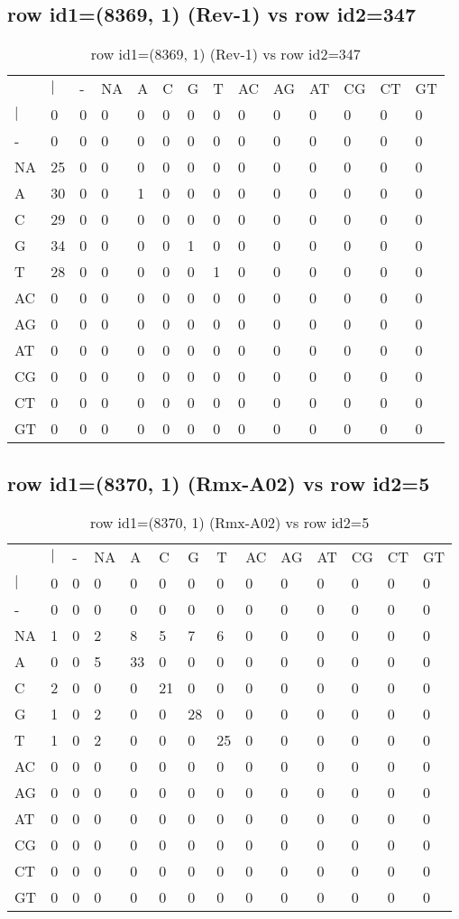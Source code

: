\subsection{row id1=(8369, 1) (Rev-1) vs row id2=347}
\begin{center}
\begin{longtable}{|l|l|l|l|l|l|l|l|l|l|l|l|l|l|}
\caption{row id1=(8369, 1) (Rev-1) vs row id2=347} \label{table_dm602}\\
\hline
\\
\hline
&$|$&-&NA&A&C&G&T&AC&AG&AT&CG&CT&GT\\
$|$&0&0&0&0&0&0&0&0&0&0&0&0&0\\
-&0&0&0&0&0&0&0&0&0&0&0&0&0\\
NA&25&0&0&0&0&0&0&0&0&0&0&0&0\\
A&30&0&0&1&0&0&0&0&0&0&0&0&0\\
C&29&0&0&0&0&0&0&0&0&0&0&0&0\\
G&34&0&0&0&0&1&0&0&0&0&0&0&0\\
T&28&0&0&0&0&0&1&0&0&0&0&0&0\\
AC&0&0&0&0&0&0&0&0&0&0&0&0&0\\
AG&0&0&0&0&0&0&0&0&0&0&0&0&0\\
AT&0&0&0&0&0&0&0&0&0&0&0&0&0\\
CG&0&0&0&0&0&0&0&0&0&0&0&0&0\\
CT&0&0&0&0&0&0&0&0&0&0&0&0&0\\
GT&0&0&0&0&0&0&0&0&0&0&0&0&0\\
\hline
\end{longtable}
\end{center}

\subsection{row id1=(8370, 1) (Rmx-A02) vs row id2=5}
\begin{center}
\begin{longtable}{|l|l|l|l|l|l|l|l|l|l|l|l|l|l|}
\caption{row id1=(8370, 1) (Rmx-A02) vs row id2=5} \label{table_dm604}\\
\hline
\\
\hline
&$|$&-&NA&A&C&G&T&AC&AG&AT&CG&CT&GT\\
$|$&0&0&0&0&0&0&0&0&0&0&0&0&0\\
-&0&0&0&0&0&0&0&0&0&0&0&0&0\\
NA&1&0&2&8&5&7&6&0&0&0&0&0&0\\
A&0&0&5&33&0&0&0&0&0&0&0&0&0\\
C&2&0&0&0&21&0&0&0&0&0&0&0&0\\
G&1&0&2&0&0&28&0&0&0&0&0&0&0\\
T&1&0&2&0&0&0&25&0&0&0&0&0&0\\
AC&0&0&0&0&0&0&0&0&0&0&0&0&0\\
AG&0&0&0&0&0&0&0&0&0&0&0&0&0\\
AT&0&0&0&0&0&0&0&0&0&0&0&0&0\\
CG&0&0&0&0&0&0&0&0&0&0&0&0&0\\
CT&0&0&0&0&0&0&0&0&0&0&0&0&0\\
GT&0&0&0&0&0&0&0&0&0&0&0&0&0\\
\hline
\end{longtable}
\end{center}

